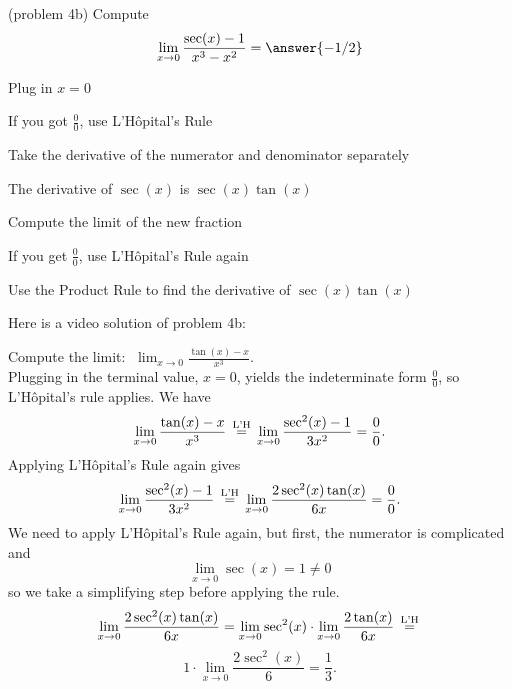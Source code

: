 \documentclass[handout]{ximera}
\begin{document}
\begin{problem}(problem 4b)
  Compute
  \[
  \lim_{x \to 0} \frac{\sec(x) - 1}{x^3 - x^2} = \answer{-1/2}
  \]
  
    \begin{hint}
      Plug in $x=0$
    \end{hint}
    \begin{hint}
      If you got $\frac00$, use L'H\^{o}pital's Rule
    \end{hint}
    \begin{hint}
      Take the derivative of the numerator and denominator separately
    \end{hint}
		\begin{hint}
		  The derivative of $\sec(x)$ is $\sec(x)\tan(x)$
	  \end{hint}
		\begin{hint}
      Compute the limit of the new fraction
    \end{hint}
		\begin{hint}
		 If you get $\frac00$, use L'H\^{o}pital's Rule again
    \end{hint}
		\begin{hint}
		  Use the Product Rule to find the derivative of $\sec(x)\tan(x)$
		\end{hint}
		
\end{problem}

Here is a video solution of  problem 4b:
\begin{foldable}
\end{foldable}

\begin{example}[example 5]
Compute the limit:  $\displaystyle{\;\lim_{x \to 0} \frac{\tan(x)-x}{x^3}}.$\\
Plugging in the terminal value, $x=0$, yields 
the indeterminate form $\frac00$, so L'H\^{o}pital's rule applies.
We have 
\[\lim_{x \to 0} \frac{\tan(x)-x}{x^3} \,\overset{\scriptsize\text{L'H}}{=}\, \lim_{x \to 0} \frac{\sec^2(x)-1}{3x^2} = \frac{0}{0}.\]
Applying L'H\^{o}pital's Rule again gives
\[\lim_{x \to 0} \frac{\sec^2(x)-1}{3x^2} \,\overset{\scriptsize\text{L'H}}{=}\, \lim_{x \to 0} \frac{2\sec^2(x)\tan(x)}{6x} = \frac{0}{0}.\]	
We need to apply L'H\^{o}pital's Rule again, but first, the numerator is complicated and 								
\[\lim_{x \to 0} \sec(x) = 1 \neq 0\]
so we take a simplifying step before applying the rule.
\[\lim_{x \to 0} \frac{2\sec^2(x)\tan(x)}{6x} = 
\lim_{x \to 0} \sec^2(x) \cdot \lim_{x \to 0} \frac{2\tan(x)}{6x}\,\overset{\scriptsize\text{L'H}}{=}\,\]
 \[1\cdot \lim_{x \to 0} \frac{2\sec^2(x)}{6} =\frac{1}{3}.\]
\end{example}
\end{document}

